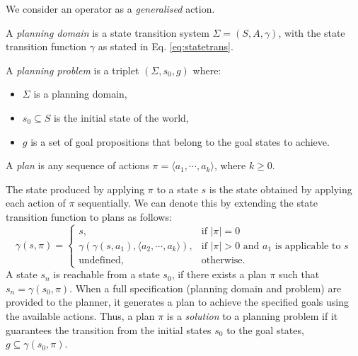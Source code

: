 We consider an operator as a \textit{generalised} action.

\begin{definition}
A \textit{planning domain} is a state transition system $\Sigma = (S, A, \gamma)$, with the state transition function $\gamma$ as stated in Eq. \ref{eq:statetrans}.
\end{definition}

\begin{definition}
A \textit{planning problem} is a triplet $(\Sigma, s_0, g)$ where:
\begin{itemize}
	\item $\Sigma$ is a planning domain,
	\item $s_0 \subseteq S$ is the initial state of the world,
	\item $g$ is a set of goal propositions that belong to the goal states to achieve.
\end{itemize}
\end{definition}

\begin{definition}
	A \textit{plan} is any sequence of actions $\pi = \langle a_1,\cdots, a_k\rangle$, where $k\geq 0$. 
\end{definition}
The state produced by applying $\pi$ to a state $s$ is the state obtained by applying each action of $\pi$ sequentially. 
We can denote this by extending the state transition function to plans as follows:
\[\gamma(s,\pi)=\left\{
\begin{array}{ll}
s, &\mbox{if $|\pi|=0$} \\
\gamma(\gamma(s,a_1),\langle a_2,\cdots, a_k\rangle ), &\mbox{if $|\pi|>0$ and $a_1$ is applicable to $s$} \\
\mbox{undefined}, &\mbox{otherwise.}
\end{array}
\right.
\]
A state $s_n$ is reachable from a state $s_0$, if there exists a plan $\pi$ such that $s_{n} = \gamma(s_0, \pi)$.
When a full specification (\ie planning domain and problem) are provided to the planner, it generates a plan to achieve the specified goals using the available actions.
Thus, a plan $\pi$ is a \textit{solution} to a planning problem if it guarantees the transition from the initial states $s_0$ to the goal states, \ie $g \subseteq \gamma (s_0,\pi)$. 

